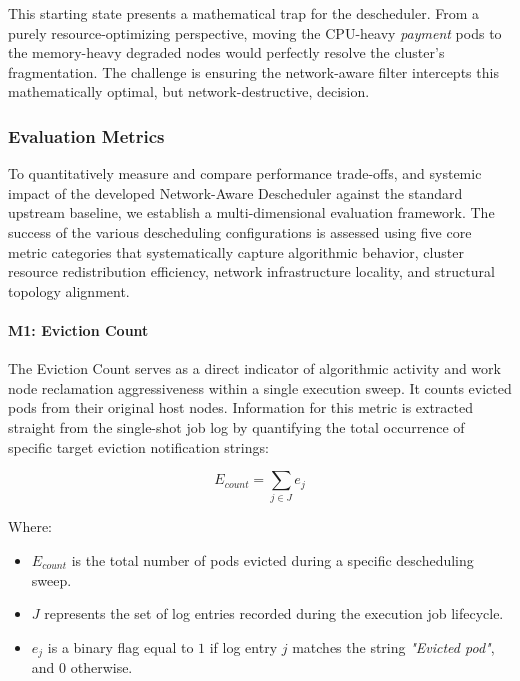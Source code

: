 This starting state presents a mathematical trap for the descheduler. From a purely resource-optimizing perspective, moving the CPU-heavy \textit{payment} pods to the memory-heavy degraded nodes would perfectly resolve the cluster's fragmentation. The challenge is ensuring the network-aware filter intercepts this mathematically optimal, but network-destructive, decision.

\subsubsection{Evaluation Metrics}
\label{subsec:netaware4_evaluationmetrics}
To quantitatively measure and compare performance trade-offs, and systemic impact of the developed Network-Aware Descheduler against the standard upstream baseline, we establish a multi-dimensional evaluation framework. The success of the various descheduling configurations is assessed using five core metric categories that systematically capture algorithmic behavior, cluster resource redistribution efficiency, network infrastructure locality, and structural topology alignment.

\paragraph{M1: Eviction Count}
\label{subsubsec:netaware4_evaluationmetrics1}
The Eviction Count serves as a direct indicator of algorithmic activity and work node reclamation aggressiveness within a single execution sweep. It counts evicted pods from their original host nodes. Information for this metric is extracted straight from the single-shot job log by quantifying the total occurrence of specific target eviction notification strings:

\[
E_{count} = \sum_{j \in J} e_j
\]

Where:

\begin{itemize}
    \item \(E_{count}\) is the total number of pods evicted during a specific descheduling sweep.

    \item \(J\) represents the set of log entries recorded during the execution job lifecycle.

    \item \(e_j\) is a binary flag equal to \(1\) if log entry \(j\) matches the string \textit{"Evicted pod"}, and \(0\) otherwise.
\end{itemize}

